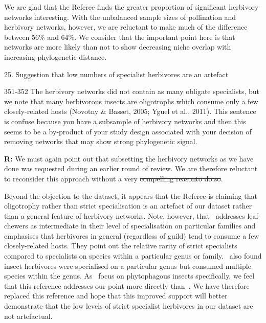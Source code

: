 \documentclass[12pt]{letter}
\newenvironment{refquote}{\bigskip \begin{it}}{\end{it}\smallskip}
\providecommand{\DIFadd}[1]{{\protect\color{blue}\uwave{#1}}} %
\providecommand{\DIFdel}[1]{{\protect\color{red}\sout{#1}}}                      %
\providecommand{\DIFaddbegin}{} %
\providecommand{\DIFaddend}{} %
\providecommand{\DIFdelbegin}{} %
\providecommand{\DIFdelend}{} %
\newcommand{\DIFscaledelfig}{0.5}
\newlength{\DIFdelgraphicswidth} %
\newlength{\DIFdelgraphicsheight} %
\newcommand{\DIFaddincludegraphics}[2][]{{\color{blue}\fbox{\DIFOincludegraphics[#1]{#2}}}} %
\newcommand{\DIFdelincludegraphics}[2][]{%
\sbox{\DIFdelgraphicsbox}{\DIFOincludegraphics[#1]{#2}}%
\settoboxwidth{\DIFdelgraphicswidth}{\DIFdelgraphicsbox} %
\settoboxtotalheight{\DIFdelgraphicsheight}{\DIFdelgraphicsbox} %
\scalebox{\DIFscaledelfig}{%
\parbox[b]{\DIFdelgraphicswidth}{\usebox{\DIFdelgraphicsbox}\\[-\baselineskip] \rule{\DIFdelgraphicswidth}{0em}}\llap{\resizebox{\DIFdelgraphicswidth}{\DIFdelgraphicsheight}{%
\setlength{\unitlength}{\DIFdelgraphicswidth}%
\begin{picture}(1,1)%
\thicklines\linethickness{2pt} %
{\color[rgb]{1,0,0}\put(0,0){\framebox(1,1){}}}%
{\color[rgb]{1,0,0}\put(0,0){\line( 1,1){1}}}%
{\color[rgb]{1,0,0}\put(0,1){\line(1,-1){1}}}%
\end{picture}%
}\hspace*{3pt}}} %
} %
\DeclareRobustCommand{\DIFaddbegin}{\DIFOaddbegin \let\includegraphics\DIFaddincludegraphics} %
\DeclareRobustCommand{\DIFaddend}{\DIFOaddend \let\includegraphics\DIFOincludegraphics} %
\DeclareRobustCommand{\DIFdelbegin}{\DIFOdelbegin \let\includegraphics\DIFdelincludegraphics} %
\DeclareRobustCommand{\DIFdelend}{\DIFOaddend \let\includegraphics\DIFOincludegraphics} %
\begin{document}
		We are glad that the Referee finds the greater proportion of significant herbivory networks interesting. With the unbalanced sample sizes of pollination and herbivory networks, however, we are \DIFaddbegin \DIFadd{somewhat }\DIFaddend reluctant to make much of the difference between 56\% and 64\%. We consider that the important point here is that networks are more likely than not to show decreasing niche overlap with increasing phylogenetic distance. 


	25. Suggestion that low numbers of specialist herbivores are an artefact


		\begin{refquote}
			351-352 The herbivory networks did not contain as many obligate specialists, but we note that many herbivorous insects are oligotrophs which consume only a few closely-related hosts (Novotny \& Basset, 2005; Yguel et al., 2011). This sentence is confuse because you have a subsample of herbivory networks and then this seems to be a by-product of your study design associated with your decision of removing networks that may show strong phylogenetic signal.
		\end{refquote}


		\textbf{R:} We must again point out that subsetting the herbivory networks as we have done was requested during an earlier round of review. We are therefore reluctant to reconsider this approach without a very \DIFdelbegin \DIFdel{compelling reasonto do so}\DIFdelend \DIFaddbegin \DIFadd{good reason}\DIFaddend . 


		Beyond the objection to the dataset, it appears that the Referee is claiming that oligotrophy rather than strict specialisation is an artefact of our dataset rather than a general feature of herbivory networks. Note, however, that~\citet{Novotny2005} addresses leaf-chewers as intermediate in their level of specialisation on particular families and emphasises that herbivores in general (regardless of guild) tend to consume a few closely-related hosts. They point out the relative rarity of strict specialists compared to specialists on species within a particular genus or family.~\citet{Brandle2006} also found insect herbivores were specialised on a particular genus but consumed multiple species within the genus. As~\citet{Brandle2006} focus on phytophagous insects specifically, we feel that this reference addresses our point more directly than~\citet{Yguel2011}. We have therefore replaced this reference and hope that this improved support will better demonstrate that the low levels of strict specialist herbivores in our dataset are not artefactual.
\end{document}

